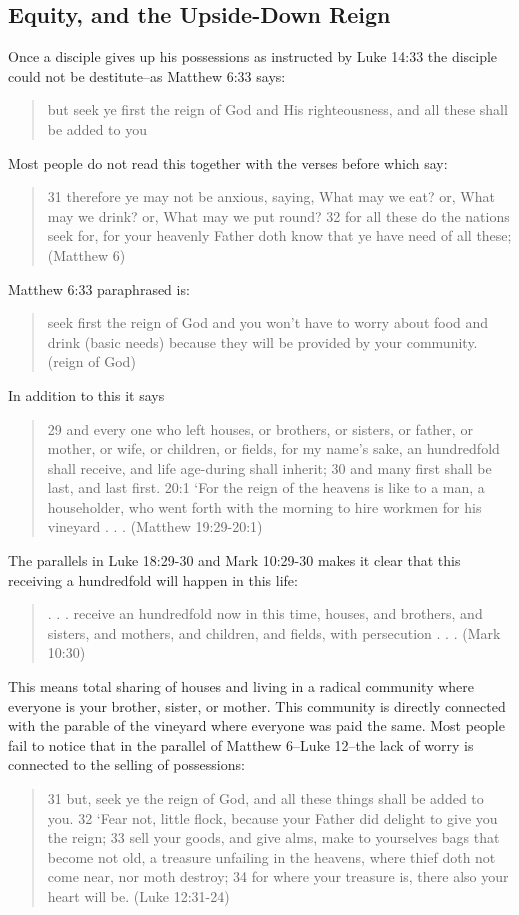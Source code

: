 \documentclass[11pt]{article}
\begin{document}
\subsection{Equity, and the Upside-Down Reign}
Once a disciple gives up his possessions as instructed by Luke 14:33 the disciple could not be destitute--as Matthew 6:33 says: 
\begin{quote}
but seek ye first the reign of God and His righteousness, and all these shall be added to you
\end{quote}
Most people do not read this together with the verses before which say:
\begin{quote}
31 therefore ye may not be anxious, saying, What may we eat? or, What may we drink? or, What may we put round? 32 for all these do the nations seek for, for your heavenly Father doth know that ye have need of all these; (Matthew 6) 
\end{quote}
Matthew 6:33 paraphrased is:
\begin{quote}
seek first the reign of God and you won't have to worry about food and drink (basic needs) because they will be provided by your community. (reign of God)
\end{quote}
In addition to this it says 
\begin{quote}
29 and every one who left houses, or brothers, or sisters, or father, or mother, or wife, or children, or fields, for my name's sake, an hundredfold shall receive, and life age-during shall inherit; 30 and many first shall be last, and last first. 20:1 `For the reign of the heavens is like to a man, a householder, who went forth with the morning to hire workmen for his vineyard . . . (Matthew 19:29-20:1)
\end{quote}
The parallels in Luke 18:29-30 and Mark 10:29-30 makes it clear that this receiving a hundredfold will happen in this life: 
\begin{quote}
. . . receive an hundredfold now in this time, houses, and brothers, and sisters, and mothers, and children, and fields, with persecution . . . (Mark 10:30) 
\end{quote}
This means total sharing of houses and living in a radical community where everyone is your brother, sister, or mother. This community is directly connected with the parable of the vineyard where everyone was paid the same. Most people fail to notice that in the parallel of Matthew 6--Luke 12--the lack of worry is connected to the selling of possessions:
\begin{quote}
31 but, seek ye the reign of God, and all these things shall be added to you.
32 `Fear not, little flock, because your Father did delight to give you the reign;
33 sell your goods, and give alms, make to yourselves bags that become not old, a treasure unfailing in the heavens, where thief doth not come near, nor moth destroy;
34 for where your treasure is, there also your heart will be. (Luke 12:31-24)
\end{quote}
\end{document}
